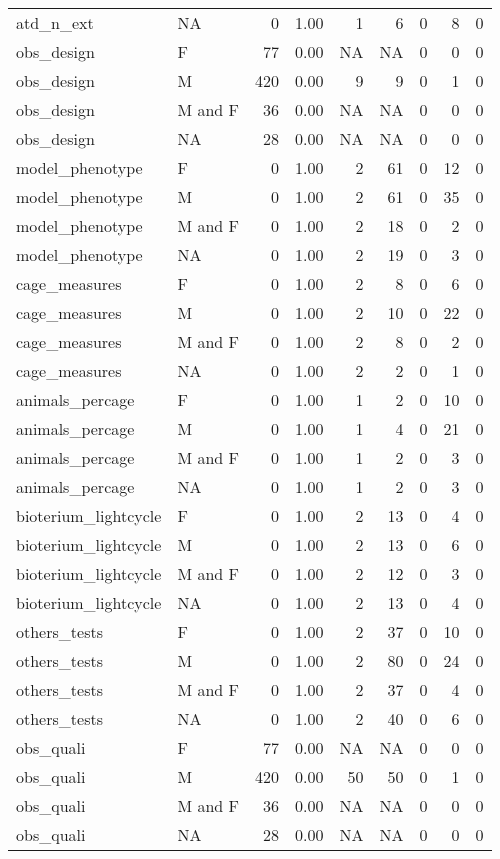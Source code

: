 \documentclass[
]{article}
\begin{document}
\begin{longtable}[]{@{}llrrrrrrr@{}}
atd\_n\_ext & NA & 0 & 1.00 & 1 & 6 & 0 & 8 & 0 \\
obs\_design & F & 77 & 0.00 & NA & NA & 0 & 0 & 0 \\
obs\_design & M & 420 & 0.00 & 9 & 9 & 0 & 1 & 0 \\
obs\_design & M and F & 36 & 0.00 & NA & NA & 0 & 0 & 0 \\
obs\_design & NA & 28 & 0.00 & NA & NA & 0 & 0 & 0 \\
model\_phenotype & F & 0 & 1.00 & 2 & 61 & 0 & 12 & 0 \\
model\_phenotype & M & 0 & 1.00 & 2 & 61 & 0 & 35 & 0 \\
model\_phenotype & M and F & 0 & 1.00 & 2 & 18 & 0 & 2 & 0 \\
model\_phenotype & NA & 0 & 1.00 & 2 & 19 & 0 & 3 & 0 \\
cage\_measures & F & 0 & 1.00 & 2 & 8 & 0 & 6 & 0 \\
cage\_measures & M & 0 & 1.00 & 2 & 10 & 0 & 22 & 0 \\
cage\_measures & M and F & 0 & 1.00 & 2 & 8 & 0 & 2 & 0 \\
cage\_measures & NA & 0 & 1.00 & 2 & 2 & 0 & 1 & 0 \\
animals\_percage & F & 0 & 1.00 & 1 & 2 & 0 & 10 & 0 \\
animals\_percage & M & 0 & 1.00 & 1 & 4 & 0 & 21 & 0 \\
animals\_percage & M and F & 0 & 1.00 & 1 & 2 & 0 & 3 & 0 \\
animals\_percage & NA & 0 & 1.00 & 1 & 2 & 0 & 3 & 0 \\
bioterium\_lightcycle & F & 0 & 1.00 & 2 & 13 & 0 & 4 & 0 \\
bioterium\_lightcycle & M & 0 & 1.00 & 2 & 13 & 0 & 6 & 0 \\
bioterium\_lightcycle & M and F & 0 & 1.00 & 2 & 12 & 0 & 3 & 0 \\
bioterium\_lightcycle & NA & 0 & 1.00 & 2 & 13 & 0 & 4 & 0 \\
others\_tests & F & 0 & 1.00 & 2 & 37 & 0 & 10 & 0 \\
others\_tests & M & 0 & 1.00 & 2 & 80 & 0 & 24 & 0 \\
others\_tests & M and F & 0 & 1.00 & 2 & 37 & 0 & 4 & 0 \\
others\_tests & NA & 0 & 1.00 & 2 & 40 & 0 & 6 & 0 \\
obs\_quali & F & 77 & 0.00 & NA & NA & 0 & 0 & 0 \\
obs\_quali & M & 420 & 0.00 & 50 & 50 & 0 & 1 & 0 \\
obs\_quali & M and F & 36 & 0.00 & NA & NA & 0 & 0 & 0 \\
obs\_quali & NA & 28 & 0.00 & NA & NA & 0 & 0 & 0 \\
\bottomrule
\end{longtable}
\end{document}
